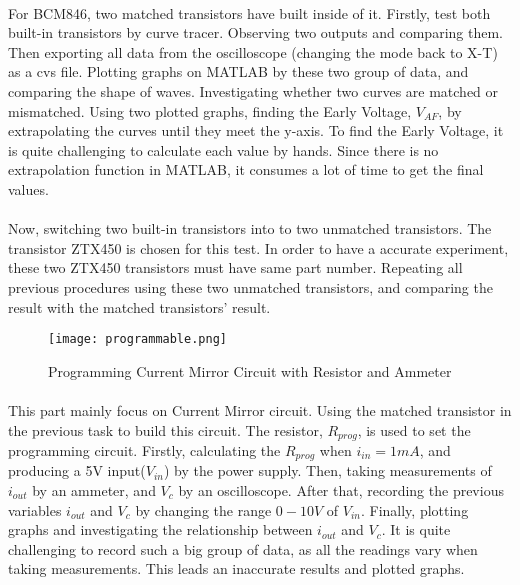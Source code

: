 \documentclass[12pt]{article}
\begin{document}
    \paragraph{}
    For BCM846, two matched transistors have built inside of it. Firstly, test both built-in transistors by curve tracer. Observing two outputs and comparing them. Then exporting all data from the oscilloscope (changing the mode back to X-T) as a cvs file. Plotting graphs on MATLAB by these two group of data, and comparing the shape of waves. Investigating whether two curves are matched or mismatched. Using two plotted graphs, finding the Early Voltage, $V_{AF}$, by extrapolating the curves until they meet the y-axis. To find the Early Voltage, it is quite challenging to calculate each value by hands. Since there is no extrapolation function in MATLAB, it consumes a lot of time to get the final values. 
    
    \paragraph{}
    Now, switching two built-in transistors into to two unmatched transistors. The transistor ZTX450 is chosen for this test. In order to have a accurate experiment, these two ZTX450 transistors must have same part number. Repeating all previous procedures using these two unmatched transistors, and comparing the result with the matched transistors' result. 
    \begin{figure}[H]
    \centering
    \texttt{[image: programmable.png]}
    \caption{Programming Current Mirror Circuit with Resistor and Ammeter \cite{3}}
    \end{figure}
    \paragraph{}
    This part mainly focus on Current Mirror circuit. Using the matched transistor in the previous task to build this circuit. The resistor, $R_{prog}$, is used to set the programming circuit. Firstly, calculating the $R_{prog}$ when $i_{in}=1 mA$, and producing a 5V input($V_{in}$) by the power supply. Then, taking measurements of $i_{out}$ by an ammeter, and $V_c$ by an oscilloscope. After that, recording the previous variables $i_{out}$ and $V_c$ by changing the range $0-10V$ of $V_{in}$. Finally, plotting graphs and investigating the relationship between $i_{out}$ and $V_c$. It is quite challenging to record such a big group of data, as all the readings vary when taking measurements. This leads an inaccurate results and plotted graphs. 
    
\end{document}

